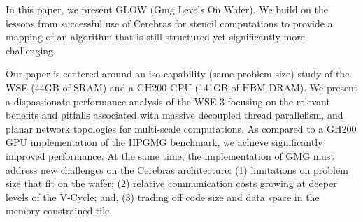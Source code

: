 \documentclass[sigconf]{acmart}
\begin{document}
In this paper, we present GLOW (Gmg Levels On Wafer).  We build on the lessons from successful use of Cerebras for stencil computations to provide a mapping of an algorithm that is
still structured yet significantly more challenging. %

Our paper is centered around an iso-capability (same problem size) study of the WSE (44GB of SRAM) and a GH200 GPU (141GB of HBM DRAM).  We present a dispassionate performance analysis of the WSE-3 focusing on the relevant benefits and pitfalls associated with massive decoupled thread parallelism, and planar network topologies for multi-scale computations.  As compared to a GH200 GPU implementation of the HPGMG benchmark, we achieve significantly improved performance.  At the same time,  
the implementation of GMG must address new challenges on the Cerebras architecture: (1) limitations on problem size that fit on the wafer; (2) relative communication costs growing at deeper levels of the V-Cycle; and, (3) trading off code size and data space in the memory-constrained tile. 
\end{document}
